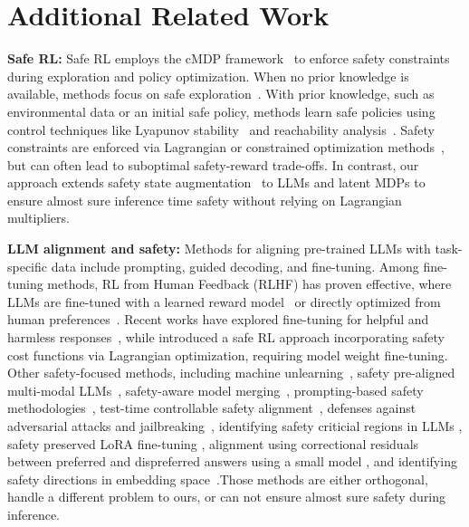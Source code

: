 
\onecolumn
\section{Additional Related Work}\label{sec:rel-2}

\textbf{Safe RL:} Safe RL employs the cMDP framework~\citep{altman1999constrained} to enforce safety constraints during exploration and policy optimization. When no prior knowledge is available, methods focus on safe exploration~\citep{turchetta2016safe, koller2018learning, dalal2018safe, wachi2018safe, bharadhwaj2020conservative}. With prior knowledge, such as environmental data or an initial safe policy, methods learn safe policies using control techniques like Lyapunov stability~\citep{chow2018lyapunov, chow2019lyapunov, berkenkamp2017safe, ohnishi2019barrier} and reachability analysis~\citep{cheng2019end, akametalu2014reachability, dean2019safeguarding, fisac2019bridging}. Safety constraints are enforced via Lagrangian or constrained optimization methods~\citep{achiam2017constrained, ray2019benchmarking, stooke2020responsive, yang2019relative, ding2020natural, ji2024pku}, but can often lead to suboptimal safety-reward trade-offs. In contrast, our approach extends safety state augmentation~\cite{sootla2022saute} to LLMs and latent MDPs to ensure almost sure inference time safety without relying on Lagrangian multipliers.



\textbf{LLM alignment and safety:} Methods for aligning pre-trained LLMs with task-specific data include prompting, guided decoding, and fine-tuning.
Among fine-tuning methods, RL from Human Feedback (RLHF) has proven effective, where LLMs are fine-tuned with a learned reward model~\citep{stiennon2020learning, ziegler2019fine, ouyang2022training} or directly optimized from human preferences~\citep{rafailov2023direct, azar2023general, zhao2023slic, tang2024generalized, song2024preference, ethayarajh2024kto, ramesh2024group}. Recent works have explored fine-tuning for helpful and harmless responses~\citep{bai2022training, ganguli2022red}, while \citep{dai2023safe} introduced a safe RL approach incorporating safety cost functions via Lagrangian optimization, requiring model weight fine-tuning. Other safety-focused methods, including machine unlearning~\citep{gundavarapu2024machine}, safety pre-aligned multi-modal LLMs~\citep{gou2024eyes}, safety-aware model merging~\citep{hammoud2024model}, prompting-based safety methodologies~\citep{hua2024trustagent}, test-time controllable safety alignment~\citep{zhang2024controllable}, defenses against adversarial attacks and jailbreaking~\citep{guo2024cold, qi2024safety, xu2024safedecoding}, identifying safety criticial regions in LLMs \citep{wei2024assessing},  safety preserved LoRA fine-tuning \citep{li2025salora},  alignment using correctional residuals between preferred and dispreferred answers using a small model \citep{ji2024aligner}, and identifying safety directions in embedding space~\citep{feng2024legend}.Those methods are either orthogonal, handle a different problem to ours, or can not ensure almost sure safety during inference. 



